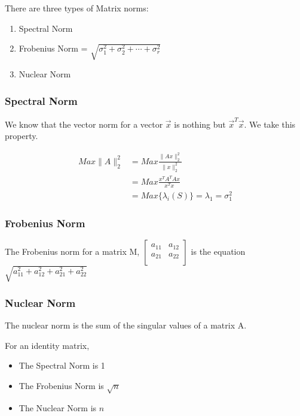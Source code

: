 \documentclass[11pt]{article}
\begin{document}
There are three types of Matrix norms:

\begin{enumerate}
	\item Spectral Norm

	\item Frobenius Norm =
	      \(\sqrt{\sigma_1^2 + \sigma_2^2 + \cdots + \sigma_r^2}\)

	\item Nuclear Norm
\end{enumerate}
\subsubsection{Spectral Norm}
\label{spectral-norm}
We know that the vector norm for a vector \(\vec{x}\) is nothing but
\(\vec{x}^T \vec{x}\). We take this property.

\[\begin{aligned}
		Max \|A\|_2^2 & = Max \frac{\|Ax\|_2^2}{\|x\|_2^2}              \\
		              & = Max \frac{x^TA^TAx}{x^Tx}                     \\
		              & = Max \{\lambda_i(S)\} = \lambda_1 = \sigma_1^2
	\end{aligned}\]
\subsubsection{Frobenius Norm}
\label{frobenius-norm}
The Frobenius norm for a matrix M, \(\begin{bmatrix}
	a_{11} & a_{12} \\
	a_{21} & a_{22} \\
\end{bmatrix}\) is the equation
\(\sqrt{a_{11}^2 + a_{12}^2 + a_{21}^2 + a_{22}^2}\)
\subsubsection{Nuclear Norm}
\label{nuclear-norm}
The nuclear norm is the sum of the singular values of a matrix A.

For an identity matrix,

\begin{itemize}
	\item The Spectral Norm is 1

	\item The Frobenius Norm is \(\sqrt{n}\)

	\item The Nuclear Norm is \({n}\)
\end{itemize}
\end{document}
